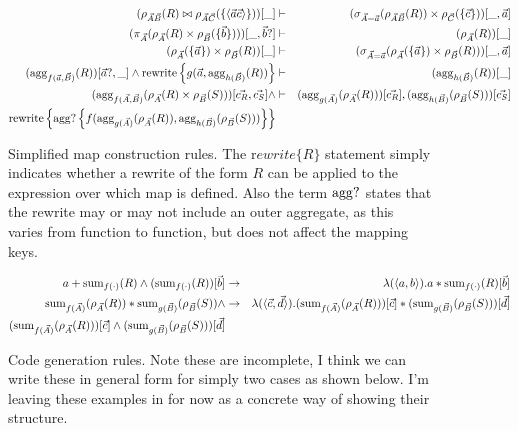 \begin{figure*}
\begin{eqnarray}
(\rho_{\vec{A}\vec{B}}(R) \bowtie
\rho_{\vec{A}\vec{C}}(\{{\langle\vec{a}\vec{c}\rangle} \}))[\_]
& \vdash &
(\sigma_{\vec{A}=\vec{a}}(\rho_{\vec{A}\vec{B}}(R))
\times \rho_{\vec{C}}(\{ \vec{c} \}))[\_,\vec{a}]
\label{mr1}
\\
(\pi_{\vec{A}}(\rho_{\vec{A}}(R) \times
\rho_{\vec{B}}(\{ \vec{b}\})))[\_,\vec{b}?]
& \vdash &
(\rho_{\vec{A}}(R))[\_]
\label{mr2}
\\
(\rho_{\vec{A}}(\{\vec{a}\}) \times \rho_{\vec{B}}(R))[\_]
& \vdash &
(\sigma_{\vec{A}=\vec{a}}(\rho_{\vec{A}}(\{\vec{a}\})
\times \rho_{\vec{B}}(R)))[\_,\vec{a}]
\label{mr3}
\\
(\mathrm{agg}_{f(\vec{a},\vec{B})}(R))[\vec{a}?,\_]
\wedge \mathrm{rewrite}\left\{g(\vec{a}, \mathrm{agg}_{h(\vec{B})}(R))\right\}
& \vdash &
(\mathrm{agg}_{h(\vec{B})}(R))[\_]
\\
(\mathrm{agg}_{f(\vec{A},\vec{B})}(
\rho_{\vec{A}}(R) \times\rho_{\vec{B}}(S)))[\vec{c_R},\vec{c_S}]
\wedge
& \vdash &
(\mathrm{agg}_{g(\vec{A})}(\rho_{\vec{A}}(R)))[\vec{c_R}],
(\mathrm{agg}_{h(\vec{B})}(\rho_{\vec{B}}(S)))[\vec{c_S}]
\\
\mathrm{rewrite}\left\{
\mathrm{agg}?\left\{ f(
\mathrm{agg}_{g(\vec{A})}(\rho_{\vec{A}}(R)),
\mathrm{agg}_{h(\vec{B})}(\rho_{\vec{B}}(S)) )
\right\}
\right\}
& &
\end{eqnarray}
\caption{Simplified map construction rules. The ${\mathrm rewrite\{R\}}$
statement simply indicates whether a rewrite of the form $R$ can be applied to
the expression over which map is defined. Also the term $\mathrm{agg}?$ states that
the rewrite may or may not include an outer aggregate, as this varies from
function to function, but does not affect the mapping keys.}
\end{figure*}

\begin{figure*}
\begin{center}
\begin{eqnarray}
a + \mathrm{sum}_{f(\cdot)}(R) \wedge
(\mathrm{sum}_{f(\cdot)}(R))[\vec{b}]
& \rightarrow &
\lambda({\langle a,b\rangle}).a*\mathrm{sum}_{f(\cdot)}(R)[\vec{b}]
\label{cr1}
\\
\mathrm{sum}_{f(\vec{A})}(\rho_{\vec{A}}(R)) *
\mathrm{sum}_{g(\vec{B})}(\rho_{\vec{B}}(S)) \wedge
& \rightarrow &
\lambda({\langle\vec{c},\vec{d}\rangle}).
(\mathrm{sum}_{f(\vec{A})}(\rho_{\vec{A}}(R)))[\vec{c}] * 
(\mathrm{sum}_{g(\vec{B})}(\rho_{\vec{B}}(S)))[\vec{d}]
\label{cr2}
\\
(\mathrm{sum}_{f(\vec{A})}(\rho_{\vec{A}}(R)))[\vec{c}] \wedge 
(\mathrm{sum}_{g(\vec{B})}(\rho_{\vec{B}}(S)))[\vec{d}]
& & \nonumber
\end{eqnarray}
\end{center}
\caption{Code generation rules. Note these are incomplete, I think we can write
these in general form for simply two cases as shown below. I'm leaving these
examples in for now as a concrete way of showing their structure.}
\label{fig:codegenrules}
\end{figure*}


